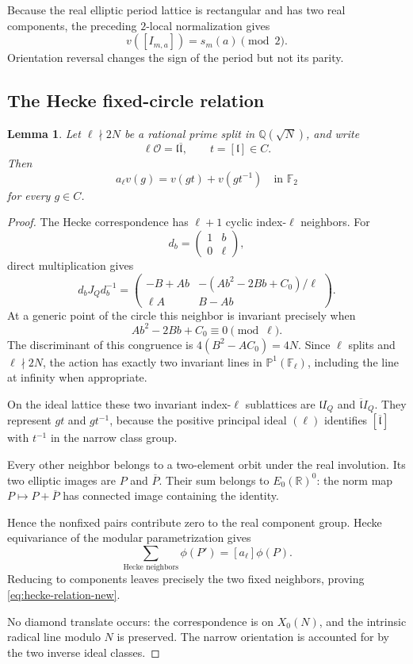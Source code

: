 \documentclass[11pt]{article}
\newtheorem{lemma}[theorem]{Lemma}
\begin{document}
Because the real elliptic period lattice is
rectangular and has two real components,
the preceding $2$-local normalization gives
\begin{equation}\label{eq:component-symbol-new}
\boxed{
v([I_{m,a}])=s_m(a)\pmod2.
}
\end{equation}
Orientation reversal changes the sign of
the period but not its parity.

\subsection{The Hecke fixed-circle relation}

\begin{lemma}\label{lem:hecke-circle-new}
Let $\ell\nmid2N$ be a rational prime split
in $\mathbb Q(\sqrt N)$, and write
\[
\ell\mathcal O=\mathfrak l\overline{\mathfrak l},
\qquad t=[\mathfrak l]\in C.
\]
Then
\begin{equation}\label{eq:hecke-relation-new}
a_\ell v(g)=v(gt)+v(gt^{-1})
\quad\text{in }\mathbb F_2
\end{equation}
for every $g\in C$.
\end{lemma}

\begin{proof}
The Hecke correspondence has $\ell+1$
cyclic index-$\ell$ neighbors.
For
\[
d_b=\begin{pmatrix}1&b\\0&\ell\end{pmatrix},
\]
direct multiplication gives
\[
d_bJ_Qd_b^{-1}
=
\begin{pmatrix}
-B+Ab&
-(Ab^2-2Bb+C_0)/\ell\\
\ell A&B-Ab
\end{pmatrix}.
\]
At a generic point of the circle this neighbor is invariant precisely when
\[
Ab^2-2Bb+C_0\equiv0\pmod\ell.
\]
The discriminant of this congruence is
$4(B^2-AC_0)=4N$.
Since $\ell$ splits and $\ell\nmid2N$,
the action has exactly two invariant lines
in $\mathbb P^1(\mathbb F_\ell)$, including
the line at infinity when appropriate.

On the ideal lattice these two invariant
index-$\ell$ sublattices are
$\mathfrak l I_Q$ and
$\overline{\mathfrak l}I_Q$.
They represent $gt$ and $gt^{-1}$,
because the positive principal ideal
$(\ell)$ identifies
$[\overline{\mathfrak l}]$ with $t^{-1}$
in the narrow class group.

Every other neighbor belongs to a two-element
orbit under the real involution.
Its two elliptic images are $P$ and
$\overline P$. Their sum belongs to
$E_0(\mathbb R)^0$: the norm map
$P\mapsto P+\overline P$ has connected image
containing the identity.

Hence the nonfixed pairs contribute zero
to the real component group.
Hecke equivariance of the modular
parametrization gives
\[
\sum_{\text{Hecke neighbors}}\phi(P')
=[a_\ell]\phi(P).
\]
Reducing to components leaves precisely
the two fixed neighbors, proving
\eqref{eq:hecke-relation-new}.

No diamond translate occurs: the
correspondence is on $X_0(N)$, and the
intrinsic radical line modulo $N$ is
preserved. The narrow orientation is
accounted for by the two inverse ideal
classes.
\end{proof}
\end{document}
